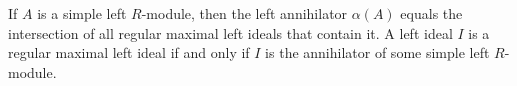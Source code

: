 If $A$ is a simple left $R$-module, then the left annihilator $\alpha(A)$ equals the intersection of all regular maximal left ideals that contain it. A left ideal $I$ is a regular maximal left ideal if and only if $I$ is the annihilator of some simple left $R$-module.
